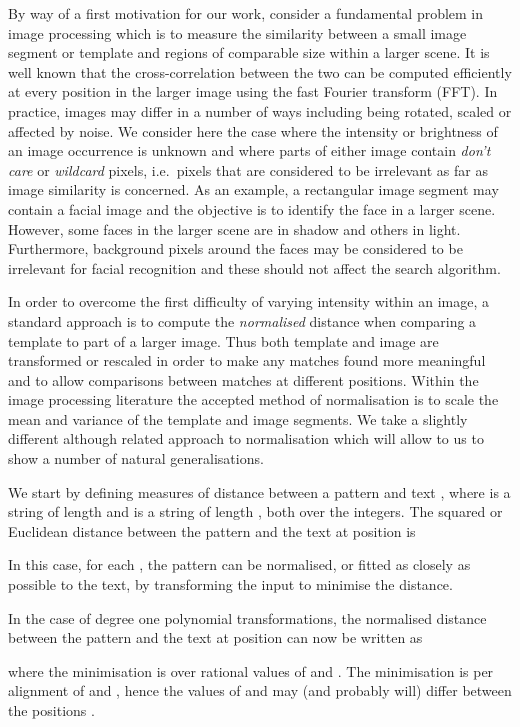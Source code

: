\documentclass[11pt]{article}
\theoremstyle{plain}
\theoremstyle{definition}
\begin{document}
By way of a first motivation for our work, consider a fundamental problem in image processing which is to measure the similarity between a small image segment or template and regions of comparable size within a larger scene. It is well known that the cross-correlation between the
two can be computed efficiently at every position in the larger image
using the fast Fourier transform (FFT).  In practice, images may
differ in a number of ways including being rotated, scaled or affected
by noise.  We consider here the case where the intensity or brightness
of an image occurrence is unknown and where parts of either image
contain \emph{don't care} or \emph{wildcard} pixels, i.e.\ pixels
that are considered to be irrelevant as far as image similarity is
concerned.  As an example, a rectangular image segment may contain a
facial image and the objective is to identify the face in a larger
scene. However, some faces in the larger scene are in shadow and
others in light.  Furthermore, background pixels around the faces may
be considered to be irrelevant for facial recognition and these should
not affect the search algorithm.

In order to overcome the first difficulty of varying intensity within
an image, a standard approach is to compute the \emph{normalised}
distance when comparing a template to part of a larger image.  Thus both template and image are transformed or rescaled
in order to make any matches found more meaningful and to allow comparisons between matches at different positions. Within the image processing literature the accepted method of normalisation is to scale the mean and variance of the template and image segments. We take a slightly different although related approach to normalisation which will allow to us to show a number of natural generalisations.



We start by defining measures of distance between a pattern  and text , where  is a string of length  and  is a string of length , both over the integers.
The squared  or Euclidean distance between the pattern and the text at position  is

In this case, for each , the pattern can be normalised, or fitted as closely as possible to the text, by transforming the input to minimise the distance.


In the case of degree one polynomial transformations, the normalised  distance between the pattern and the text at position  can now be written as

where the minimisation is over rational values of  and . The minimisation is per alignment of  and , hence the values of  and  may (and probably will) differ between the positions .
\end{document}
